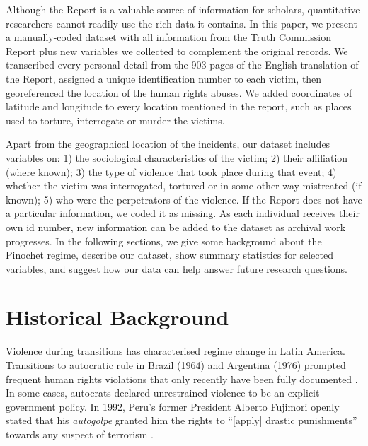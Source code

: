 \documentclass[12pt,a4paper,]{article}
\begin{document}
Although the Report is a valuable source of information for scholars,
quantitative researchers cannot readily use the rich data it contains.
In this paper, we present a manually-coded dataset with all information
from the Truth Commission Report plus new variables we collected to
complement the original records. We transcribed every personal detail
from the 903 pages of the English translation of the Report, assigned a
unique identification number to each victim, then georeferenced the
location of the human rights abuses. We added coordinates of latitude
and longitude to every location mentioned in the report, such as places
used to torture, interrogate or murder the victims.

Apart from the geographical location of the incidents, our dataset
includes variables on: 1) the sociological characteristics of the
victim; 2) their affiliation (where known); 3) the type of violence that
took place during that event; 4) whether the victim was interrogated,
tortured or in some other way mistreated (if known); 5) who were the
perpetrators of the violence. If the Report does not have a particular
information, we coded it as missing. As each individual receives their
own id number, new information can be added to the dataset as archival
work progresses. In the following sections, we give some background
about the Pinochet regime, describe our dataset, show summary statistics
for selected variables, and suggest how our data can help answer future
research questions.

\newpage

\hypertarget{historical-background}{%
\section{Historical Background}\label{historical-background}}

Violence during transitions has characterised regime change in Latin
America. Transitions to autocratic rule in Brazil (1964) and Argentina
(1976) prompted frequent human rights violations that only recently have
been fully documented
\citep{agenciabrasil2014ditadura, elpais2016argentina}. In some cases,
autocrats declared unrestrained violence to be an explicit government
policy. In 1992, Peru's former President Alberto Fujimori openly stated
that his \emph{autogolpe} granted him the rights to ``{[}apply{]}
drastic punishments'' towards any suspect of terrorism
\citetext{\citealp[97]{dabene1997narcodemocracias}; \citealp[56]{samtleben2013constitucion}}.
\end{document}
